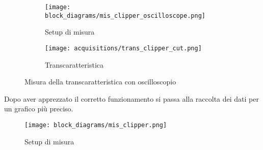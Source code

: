 \begin{figure}[H]
    \centering

    \begin{subfigure}{.5\textwidth}
        \centering
        \texttt{[image: block\_diagrams/mis\_clipper\_oscilloscope.png]}
        \caption{Setup di misura}
        \label{mis_clipper_oscilloscope}
    \end{subfigure}%
    \begin{subfigure}{.5\textwidth}
        \centering
        \texttt{[image: acquisitions/trans\_clipper\_cut.png]}
        \caption{Transcaratteristica}
        \label{clipper_transcharacteristic}
    \end{subfigure}

    \caption{Misura della transcaratteristica con oscilloscopio}
\end{figure}

Dopo aver apprezzato il corretto funzionamento si passa alla raccolta dei dati per un grafico
più preciso.

\begin{figure}[H]
    \centering
    \texttt{[image: block\_diagrams/mis\_clipper.png]}
    \caption{Setup di misura}
    \label{mis_clipper}
\end{figure}

